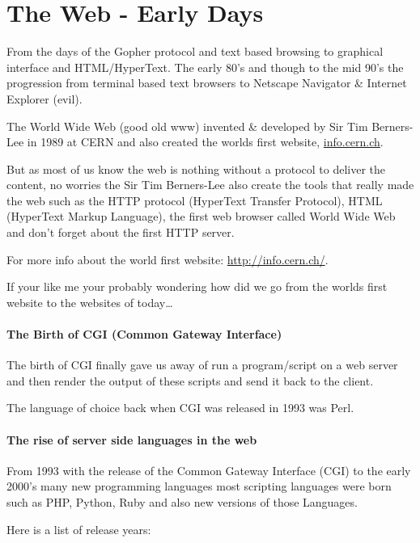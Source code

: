 \documentclass{book}
\begin{document}
\chapter{The Web - Early Days}
From the days of the Gopher protocol and text based browsing to graphical interface and HTML/HyperText. The early 80's and though to the mid 90's the progression from terminal based text browsers to Netscape Navigator \& Internet Explorer (evil).

The World Wide Web (good old www) invented \& developed by Sir Tim Berners-Lee in 1989 at CERN and also created the worlds first website,
\href{http://info.cern.ch/hypertext/WWW/TheProject.html}{info.cern.ch}\cite{wiki-History-of-the-internet, cern}.

But as most of us know the web is nothing without a protocol to deliver the content, no worries the Sir Tim Berners-Lee also create the tools that really made the web such as the HTTP protocol (HyperText Transfer Protocol), HTML (HyperText Markup Language), the first web browser called World Wide Web and don't forget about the first HTTP server\cite{wiki-History-of-the-web}.

For more info about the world first website: \href{http://info.cern.ch/}{http://info.cern.ch/}.

If your like me your probably wondering how did we go from the worlds first website to the websites of today\ldots{}

\subsubsection{The Birth of CGI (Common Gateway Interface)}
The birth of CGI finally gave us away of run a program/script on a web server and then render the output of these scripts and send it back to the client.

The language of choice back when CGI was released in 1993\cite{royal-pingdom} was Perl.

\subsubsection{The rise of server side languages in the web}
From 1993 with the release of the Common Gateway Interface (CGI) to the early 2000's many new programming languages most scripting languages were born such as PHP, Python, Ruby and also new versions of those Languages.

Here is a list of release years\cite{royal-pingdom}: 
\end{document}
